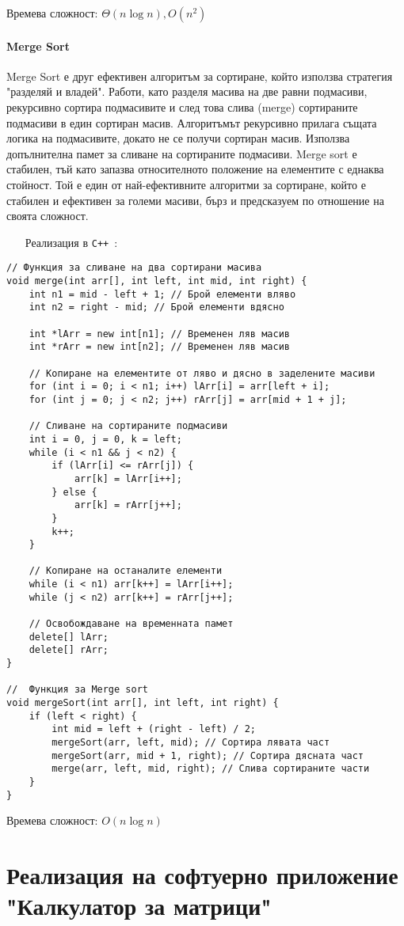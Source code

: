 \documentclass[oneside]{book}
\newcommand*{\cpp}{\texttt{C++}\ }
\begin{document}
Времева сложност: $\Theta(n\log n), O(n^2)$

\subsubsection{Merge Sort}
Merge Sort е друг ефективен алгоритъм за сортиране, който използва стратегия "разделяй и владей".
Работи, като разделя масива на две равни подмасиви, рекурсивно сортира подмасивите и след това слива (merge) сортираните подмасиви в един сортиран масив.
Алгоритъмът рекурсивно прилага същата логика на подмасивите, докато не се получи сортиран масив.
Използва допълнителна памет за сливане на сортираните подмасиви.
Merge sort е стабилен, тъй като запазва относителното положение на елементите с еднаква стойност.
Той е един от най-ефективните алгоритми за сортиране, който е стабилен и ефективен за големи масиви, бърз и предсказуем по отношение на своята сложност.

\begin{itemize}\item[Реализация] в \cpp:\end{itemize}
\begin{mdframed}\begin{lstlisting}
// Функция за сливане на два сортирани масива
void merge(int arr[], int left, int mid, int right) {
    int n1 = mid - left + 1; // Брой елементи вляво
    int n2 = right - mid; // Брой елементи вдясно

    int *lArr = new int[n1]; // Временен ляв масив
    int *rArr = new int[n2]; // Временен ляв масив

    // Копиране на елементите от ляво и дясно в заделените масиви
    for (int i = 0; i < n1; i++) lArr[i] = arr[left + i];
    for (int j = 0; j < n2; j++) rArr[j] = arr[mid + 1 + j];

    // Сливане на сортираните подмасиви
    int i = 0, j = 0, k = left;
    while (i < n1 && j < n2) {
        if (lArr[i] <= rArr[j]) {
            arr[k] = lArr[i++];
        } else {
            arr[k] = rArr[j++];
        }
        k++;
    }

    // Копиране на останалите елементи
    while (i < n1) arr[k++] = lArr[i++];
    while (j < n2) arr[k++] = rArr[j++];

    // Освобождаване на временната памет
    delete[] lArr;
    delete[] rArr;
}

//  Функция за Merge sort
void mergeSort(int arr[], int left, int right) {
    if (left < right) {
        int mid = left + (right - left) / 2;
        mergeSort(arr, left, mid); // Сортира лявата част
        mergeSort(arr, mid + 1, right); // Сортира дясната част
        merge(arr, left, mid, right); // Слива сортираните части
    }
}                      
\end{lstlisting}\end{mdframed}

Времева сложност: $O(n\log n)$

\chapter*{Реализация на софтуерно приложение "Калкулатор за матрици"}
\end{document}
